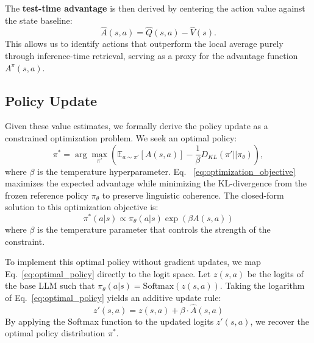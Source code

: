 The \textbf{test-time advantage} is then derived by centering the action value against the state baseline:
\begin{equation}
    \widehat A(s,a) = \widehat Q(s,a) - \widehat V(s).
    \label{eq:test_time_advantage}
\end{equation}
This allows us to identify actions that outperform the local average purely through inference-time retrieval, serving as a proxy for the advantage function $A^{\pi}(s,a)$.




\subsection{Policy Update}
\label{sec:policy_update}



Given these value estimates, we formally derive the policy update as a constrained optimization problem. We seek an optimal policy:
\begin{equation}
    \pi^* = \arg \max_{\pi'} \left( \mathbb{E}_{a \sim \pi'} [ A(s,a)] - \frac{1}{\beta} D_{KL}(\pi' || \pi_{\theta}) \right),
    \label{eq:optimization_objective}
\end{equation}
where $\beta$ is the temperature hyperparameter. Eq. ~\eqref{eq:optimization_objective} maximizes the expected advantage while minimizing the KL-divergence from the frozen reference policy $\pi_{\theta}$ to preserve linguistic coherence. The closed-form solution to this optimization objective is:
\begin{equation}
    \pi^*(a|s) \propto \pi_{\theta}(a|s) \exp\left( \beta A(s,a) \right)
    \label{eq:optimal_policy}
\end{equation}
where $\beta$ is the temperature parameter that controls the strength of the constraint. 

To implement this optimal policy without gradient updates, we map Eq.~\eqref{eq:optimal_policy} directly to the logit space. Let $z(s,a)$ be the logits of the base LLM such that $\pi_{\theta}(a|s) = \text{Softmax}(z(s,a))$. Taking the logarithm of Eq.~\eqref{eq:optimal_policy} yields an additive update rule:
\begin{equation}
    z'(s,a) = z(s,a) + \beta \cdot  \widehat A (s,a)
    \label{eq:logit_update}
\end{equation}
By applying the Softmax function to the updated logits $z'(s,a)$, we recover the optimal policy distribution $\pi^*$. 






